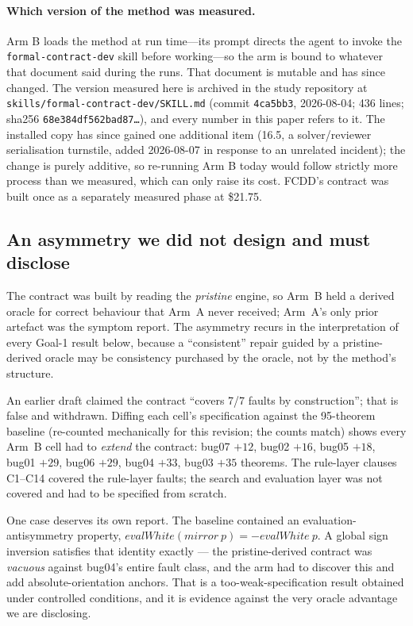 \documentclass[runningheads]{llncs}
\begin{document}
\paragraph{Which version of the method was measured.} Arm B loads the method at
run time---its prompt directs the agent to invoke the \texttt{formal-contract-dev}
skill before working---so the arm is bound to whatever that document said during
the runs. That document is mutable and has since changed. The version measured
here is archived in the study repository at
\texttt{skills/formal-contract-dev/SKILL.md} (commit \texttt{4ca5bb3},
2026-08-04; 436 lines; sha256 \texttt{68e384df562bad87\ldots}), and every number
in this paper refers to it. The installed copy has since gained one additional
item (16.5, a solver/reviewer serialisation turnstile, added 2026-08-07 in
response to an unrelated incident); the change is purely additive, so re-running
Arm B today would follow strictly more process than we measured, which can only
raise its cost.
 FCDD's contract was built once as a separately
measured phase at \$21.75.

\subsection{An asymmetry we did not design and must disclose}\label{sec:asymmetry}

The contract was built by reading the \emph{pristine} engine, so Arm~B held a
derived oracle for correct behaviour that Arm~A never received; Arm~A's only
prior artefact was the symptom report. The asymmetry recurs in the
interpretation of every Goal-1 result below, because a ``consistent'' repair
guided by a pristine-derived oracle may be consistency purchased by the
oracle, not by the method's structure.

An earlier draft claimed the contract ``covers 7/7 faults by construction'';
that is false and withdrawn. Diffing each cell's specification against the
95-theorem baseline (re-counted mechanically for this revision; the counts
match) shows every Arm~B cell had to \emph{extend} the contract: bug07 $+12$,
bug02 $+16$, bug05 $+18$, bug01 $+29$, bug06 $+29$, bug04 $+33$, bug03 $+35$
theorems. The rule-layer clauses C1--C14 covered the rule-layer faults; the
search and evaluation layer was not covered and had to be specified from
scratch.

One case deserves its own report. The baseline contained an
evaluation-antisymmetry property, $\mathit{evalWhite}(\mathit{mirror}\ p) =
-\mathit{evalWhite}\ p$. A global sign inversion satisfies that identity
exactly --- the pristine-derived contract was \emph{vacuous} against bug04's
entire fault class, and the arm had to discover this and add
absolute-orientation anchors. That is a too-weak-specification result
obtained under controlled conditions, and it is evidence against the very
oracle advantage we are disclosing.
\end{document}
